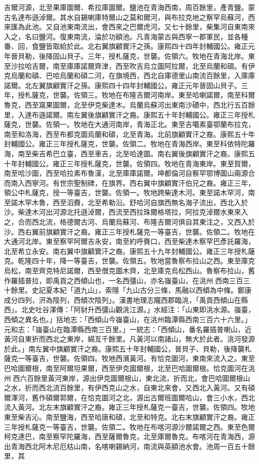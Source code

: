 \begin{pinyinscope}
吉爾河源，北至果庫圖爾、希拉庫圖爾。鹽池在青海西南，周百餘里，產青鹽。蒙古名達布遜淖爾。其水自錫喇庫特爾山之莫和爾河，與布拉克地之察罕烏蘇河，西來匯為此池。又自池東南流出，會西來之巴爾虎河。又七十餘里，柴集河自東南來入之，名曰鹽河。復東南流，淪於功額池。凡青海蒙古與西寧一郡軍民，並各種番、回，食鹽皆取給於此。北右翼旗顧實汗之孫。康熙四十四年封輔國公。雍正元年晉貝勒，後降固山貝子。三年，授札薩克，世襲。佐領六。牧地在青海北岸。東至沙拉哈吉爾，南至庫庫諾爾齊津，西至吹吉烏立圖阿拉爾，北至烏蘭和碩。有伊克烏蘭和碩、巴哈烏蘭和碩二河，在旗境西，西北自庫德里山南流百餘里，入庫庫諾爾。北左翼旗顧實汗之孫。康熙四十四年封輔國公。雍正元年晉固山貝子。三年，授札薩克，世襲。佐領三。牧地在布隆吉爾河南岸。東至哈喇諾爾，南至科爾魯克，西至窩果圖爾，北至伊克柴達木。烏蘭烏蘇河出東南沙磧中，西北行五百餘里，入達布遜諾爾。南左翼後旗顧實汗之裔。康熙五十年封輔國公。雍正三年授札薩克，世襲。佐領一。牧地在大通河南岸，青海正北。東至吉噶素臺鄂蘭布拉克，南至和洛海，西至布都克圖烏蘭和碩，北至青海。北前旗顧實汗之裔。康熙五十年封輔國公。雍正三年授札薩克，世襲。佐領二。牧地在青海西岸。東至科依特陀羅海，南至柴吉希巴立臺，西至車吉，北至哈達圖。南右翼後旗顧實汗之裔。康熙五十年封輔國公。雍正三年授札薩克，世襲。佐領四。牧地在青海東岸。東至賀爾，南至哈沙圖，西至哈拉素布魯漢，北至庫庫諾爾。坤都倫河自察罕鄂博圖山兩源合而南入西寧河。有世宗聖制碑，在旗界。西右翼中旗顧實汗伯兄之裔。雍正三年，領公中札薩克，授一等臺吉，世襲。佐領一。牧地跨柴達木河。東至諾木罕河，南至諾木罕木魯，西至滔賚，北至希勒沿。舒哈河自旗西無名海子流出，西北入於沙。柴達木河出河源北托遜淖爾，西流至西拉珠爾格塔拉，阿拉克淖爾水東來入之，合而西北流，格德爾古河、烏蘭烏蘇河、布隆吉爾河俱自其東注之，又西入於沙。西右翼前旗顧實汗之裔。雍正三年授札薩克一等臺吉，世襲。佐領二。牧地在大通河北岸。東至察罕阿爾吉永安，南至約呼賚口，西至柴達木察罕巴彥託羅海，北至希立永安。南右翼中旗顧實汗之裔。康熙五十九年封輔國公。雍正三年授札薩克。乾隆四十年，降一等臺吉，世襲。佐領五。牧地當魯察布拉山之西。東至庫克烏松，南至齊克特尼諾爾，西至僧克圖木齊，北至庫克烏松西山。魯察布拉山，舊作羅插普拉，即禹貢之西傾山也，一名西彊山，亦名嵹臺山，在洮州西南三百三十餘里。史記夏本紀「道九山」，索隱「九山古分三條，馬融以西傾為中條。鄭康成分四列，汧為陰列，西傾次陰列」。漢書地理志隴西郡臨洮，「禹貢西傾山在縣西」。北史吐谷渾傳：「阿豺升西彊山觀洮江源。」水經注：「山東即洮水源。嵹臺，西傾之異名也。」括地志：「西傾山今嵹臺山，在洮州臨潭縣西南三百六十六里。」元和志：「嵹臺山在臨潭縣西南三百里。」一統志：「西傾山，番名羅插普喇山，近黃河自東折而西北之東岸，綿亙千餘里。凡黃河以南諸山，無大於此者。洮河發源於此。」南左翼中旗顧實汗之裔。康熙五十年封輔國公，晉貝子、貝勒，後降襲札薩克一等臺吉，世襲。佐領四。牧地西濱黃河。有恰克圖河，東南來流入之。東至巴哈圖爾根，南至阿爾坦果爾，西至伊克圖爾根，北至巴哈圖爾根。恰克圖河在洮州西六百餘里黃河東岸，源出伊克圖爾根山，東北流，折而北，會巴哈圖爾根山之水，折而西北流百餘里，有伊西克山之水，自東北來會，又西北入黃河。又有碩爾渾河，舊作碩爾郭爾，在恰克圖河之北，源出古爾班圖爾哈山，會三小水，西北流入黃河。北左末旗顧實汗之裔。雍正三年授札薩克一臺吉，世襲。佐領四。牧地東至柴吉沁。南至鹽海，西至哈唐和碩，北至和特克。北右末旗顧實汗之裔。雍正三年授札薩克一等臺吉，世襲。佐領二。牧地在布喀河源沙爾諾爾之西。東至色爾柯克達巴，南至察罕陀羅海，西至薩爾魯克，北至庫爾魯克。布喀河在青海西，源出青海西北阿木尼厄枯山南，名喀喇錫納河，南流與英額池水會。池周一百五十餘里，其
\end{pinyinscope}

